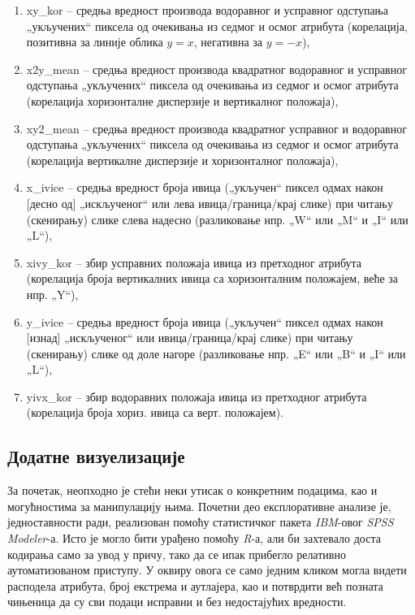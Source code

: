 \documentclass[a4paper]{article}
\begin{document}
\begin{enumerate}
\item xy\_kor -- средња вредност производа водоравног и усправног одступања „укључених“ пиксела од очекивања из седмог и осмог атрибута (корелација, позитивна за линије облика $y = x$, негативна за $y = -x$),
\item x2y\_mean -- средња вредност производа квадратног водоравног и усправног одступања „укључених“ пиксела од очекивања из седмог и осмог атрибута (корелација хоризонталне дисперзије и вертикалног положаја),
\item xy2\_mean -- средња вредност производа квадратног усправног и водоравног одступања „укључених“ пиксела од очекивања из седмог и осмог атрибута (корелација вертикалне дисперзије и хоризонталног положаја),
\item x\_ivice -- средња вредност броја ивица („укључен“ пиксел одмах након [десно од] „искљученог“ или лева ивица/граница/крај слике) при читању (скенирању) слике слева надесно (разликовање нпр. „W“ или „M“  и „I“ или „L“),
\item xivy\_kor -- збир усправних положаја ивица из претходног атрибута (корелација броја вертикалних ивица са хоризонталним положајем, веће за нпр. „Y“),
\item y\_ivice -- средња вредност броја ивица („укључен“ пиксел одмах након [изнад] „искљученог“ или ивица/граница/крај слике) при читању (скенирању) слике од доле нагоре (разликовање нпр. „E“ или „B“  и „I“ или „L“),
\item yivx\_kor -- збир водоравних положаја ивица из претходног атрибута (корелација броја хориз. ивица са верт. положајем).
\end{enumerate}

\subsection{Додатне визуелизације}

За почетак, неопходно је стећи неки утисак о конкретним подацима, као и могућностима за манипулацију њима. Почетни део експлоративне анализе је, једноставности ради, реализован помоћу статистичког пакета \textit{IBM}-овог \textit{SPSS Modeler}-а.\cite{doc} Исто је могло бити урађено помоћу \textit{R}-а, али би захтевало доста кодирања само за увод у причу, тако да се ипак прибегло релативно аутоматизованом приступу. У оквиру овога се само једним кликом могла видети расподела атрибута, број екстрема и аутлајера, као и потврдити већ позната чињеница да су сви подаци исправни и без недостајућих вредности.
\end{document}
